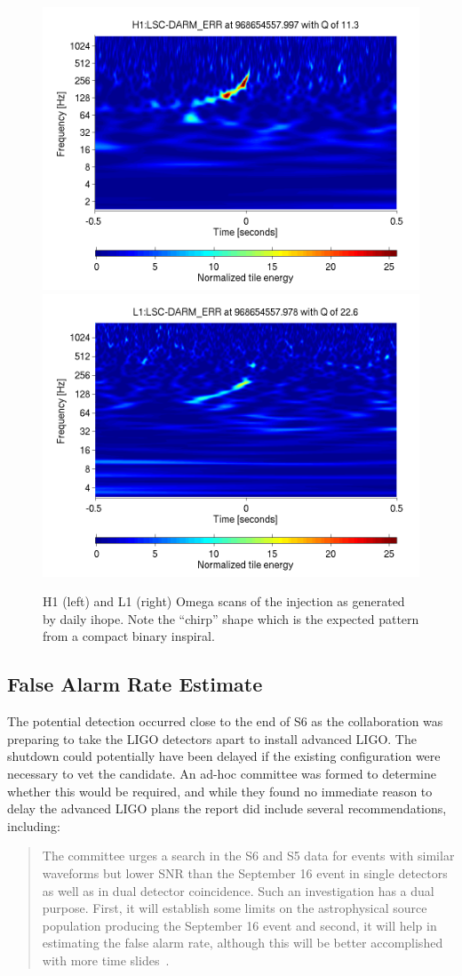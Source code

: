 \begin{figure}
  \includegraphics[width=0.5\linewidth]{figures/detchar/968654557_997314453_H1_LSC-DARM_ERR_1_00_spectrogram_whitened.png}
  \includegraphics[width=0.5\linewidth]{figures/detchar/968654557_978027343_L1_LSC-DARM_ERR_1_00_spectrogram_whitened.png}
  \caption[Omega scans of the injection]{
  \label{f:daily_ihope_dog_omega}
H1 (left) and L1 (right) Omega scans of the injection as
generated by daily ihope.  Note the ``chirp'' shape which is the
expected pattern from a compact binary inspiral.}
\end{figure}%


\subsection{False Alarm Rate Estimate}

The potential detection occurred close to the end of S6 as the
collaboration was preparing to take the LIGO detectors apart 
to install advanced LIGO.  The shutdown could potentially have been
delayed if the existing configuration were necessary to vet
the candidate.  An ad-hoc committee was formed to determine whether
this would be required, and while they found no immediate reason to
delay the advanced LIGO plans the report did include several
recommendations, including:


\begin{quote}
The committee urges a search in the S6 and S5 data for events with
similar waveforms but lower SNR than the September 16 event in single
detectors as well as in dual detector coincidence. Such an
investigation has a dual purpose. First, it will establish some limits
on the astrophysical source population producing the September 16
event and second, it will help in estimating the false alarm rate,
although this will be better accomplished with more time
slides~\cite{Weiss:injection}.
\end{quote}

